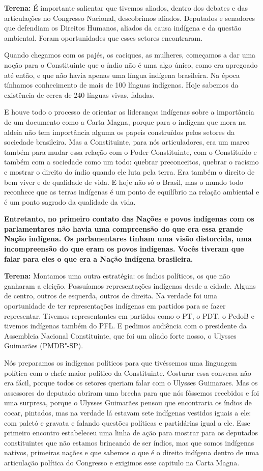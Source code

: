 \textbf{Terena:} É importante salientar que tivemos aliados, dentro dos
debates e das articulações no Congresso Nacional, descobrimos aliados.
Deputados e senadores que defendiam os Direitos Humanos, aliados da
causa indígena e da questão ambiental. Foram oportunidades que esses
setores encontraram.

Quando chegamos com os pajés, os caciques, as mulheres, começamos a dar
uma noção para o Constituinte que o índio não é uma algo único, como era
apregoado até então, e que não havia apenas uma língua indígena
brasileira. Na época tínhamos conhecimento de mais de 100 línguas
indígenas. Hoje sabemos da existência de cerca de 240 línguas vivas,
faladas.

E houve todo o processo de orientar as lideranças indígenas sobre a
importância de um documento como a Carta Magna, porque para o indígena
que mora na aldeia não tem importância alguma os papeis construídos
pelos setores da sociedade brasileira. Mas a Constituinte, para nós
articuladores, era um marco também para mudar essa relação com o Poder
Constituinte, com o Constituído e também com a sociedade como um todo:
quebrar preconceitos, quebrar o racismo e mostrar o direito do índio
quando ele luta pela terra. Era também o direito de bem viver e de
qualidade de vida. E hoje não só o Brasil, mas o mundo todo reconhece
que as terras indígenas é um ponto de equilíbrio na relação ambiental e
é um ponto sagrado da qualidade da vida.

\textbf{Entretanto, no primeiro contato das Nações e povos indígenas com
os parlamentares não havia uma compreensão do que era essa grande Nação
indígena. Os parlamentares tinham uma visão distorcida, uma
incompreensão do que eram os povos indígenas. Vocês tiveram que falar
para eles o que era a Nação indígena brasileira.}

\textbf{Terena:} Montamos uma outra estratégia: os índios políticos, os
que não ganharam a eleição. Possuíamos representações indígenas desde a
cidade. Alguns de centro, outros de esquerda, outros de direita. Na
verdade foi uma oportunidade de ter representações indígenas em partidos
para se fazer representar. Tivemos representantes em partidos como o PT,
o PDT, o PcdoB e tivemos indígenas também do PFL. E pedimos audiência
com o presidente da Assembleia Nacional Constituinte, que foi um aliado
forte nosso, o Ulysses Guimarães (PMDB"-SP).

Nós preparamos os indígenas políticos para que tivéssemos uma linguagem
política com o chefe maior político da Constituinte. Costurar essa
conversa não era fácil, porque todos os setores queriam falar com o
Ulysses Guimaraes. Mas os assessores do deputado abriram uma brecha para
que nós fôssemos recebidos e foi uma surpresa, porque o Ulysses
Guimarães pensou que encontraria os índios de cocar, pintados, mas na
verdade lá estavam sete indígenas vestidos iguais a ele: com paletó e
gravata e falando questões políticas e partidárias igual a ele. Esse
primeiro encontro estabeleceu uma linha de ação para mostrar para os
deputados constituintes que não estamos brincando de ser índios, mas que
somos indígenas nativos, primeiras nações e que sabemos o que é o
direito indígena dentro de uma articulação política do Congresso e
exigimos esse capitulo na Carta Magna.

